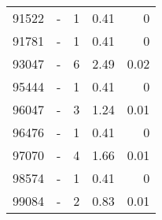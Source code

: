 \begin{longtable}{lXrrr}
        91522 & \multicolumn{1}{X}{-} & %
          \num{1} &
          \num[round-mode=places,round-precision=2]{0.41} &
          \num[round-mode=places,round-precision=2]{0} \\

        91781 & \multicolumn{1}{X}{-} & %
          \num{1} &
          \num[round-mode=places,round-precision=2]{0.41} &
          \num[round-mode=places,round-precision=2]{0} \\

        93047 & \multicolumn{1}{X}{-} & %
          \num{6} &
          \num[round-mode=places,round-precision=2]{2.49} &
          \num[round-mode=places,round-precision=2]{0.02} \\

        95444 & \multicolumn{1}{X}{-} & %
          \num{1} &
          \num[round-mode=places,round-precision=2]{0.41} &
          \num[round-mode=places,round-precision=2]{0} \\

        96047 & \multicolumn{1}{X}{-} & %
          \num{3} &
          \num[round-mode=places,round-precision=2]{1.24} &
          \num[round-mode=places,round-precision=2]{0.01} \\

        96476 & \multicolumn{1}{X}{-} & %
          \num{1} &
          \num[round-mode=places,round-precision=2]{0.41} &
          \num[round-mode=places,round-precision=2]{0} \\

        97070 & \multicolumn{1}{X}{-} & %
          \num{4} &
          \num[round-mode=places,round-precision=2]{1.66} &
          \num[round-mode=places,round-precision=2]{0.01} \\

        98574 & \multicolumn{1}{X}{-} & %
          \num{1} &
          \num[round-mode=places,round-precision=2]{0.41} &
          \num[round-mode=places,round-precision=2]{0} \\

        99084 & \multicolumn{1}{X}{-} & %
          \num{2} &
          \num[round-mode=places,round-precision=2]{0.83} &
          \num[round-mode=places,round-precision=2]{0.01} \\


\end{longtable}
